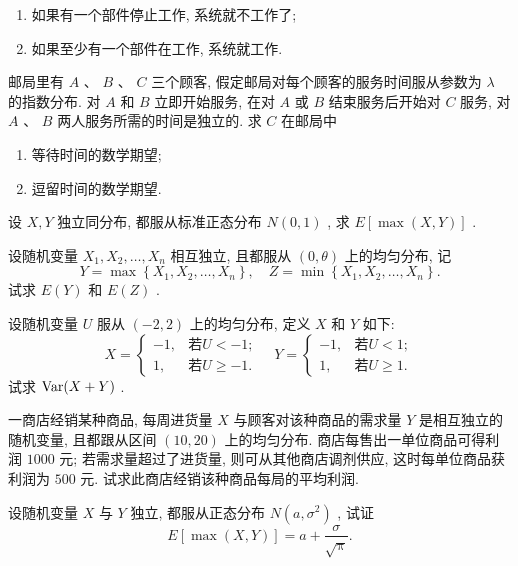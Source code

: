 \begin{xiti}
			\begin{enumerate}
				\item 如果有一个部件停止工作, 系统就不工作了;
				\item 如果至少有一个部件在工作, 系统就工作.
			\end{enumerate}
		\item 邮局里有 $A$ 、 $B$ 、 $C$ 三个顾客, 假定邮局对每个顾客的服务时间服从参数为 $\lambda$ 的指数分布. 对 $A$ 和 $B$ 立即开始服务, 在对 $A$ 或 $B$ 结束服务后开始对 $C$ 服务, 对 $A$ 、 $B$ 两人服务所需的时间是独立的. 求 $C$ 在邮局中
			\begin{enumerate}
				\item 等待时间的数学期望;
				\item 逗留时间的数学期望.
			\end{enumerate}
		\item 设 $X,Y$ 独立同分布, 都服从标准正态分布 $N(0,1)$ , 求 $E[\max(X,Y)]$ .
		\item 设随机变量 $X_1,X_2,\ldots,X_n$ 相互独立, 且都服从 $(0,\theta)$ 上的均匀分布, 记
			\begin{equation*}
				Y=\max \left\{X_{1}, X_{2}, \ldots, X_{n}\right\},\quad Z=\min \left\{X_{1}, X_{2}, \ldots, X_{n}\right\}.
			\end{equation*}
			试求 $E(Y)$ 和 $E(Z)$ .
		\item 设随机变量 $U$ 服从 $(-2,2)$ 上的均匀分布, 定义 $X$ 和 $Y$ 如下:
			\begin{equation*}
				X=\begin{cases}
					-1, & \text{若}U<-1;\\
					1, & \text{若}U\geqslant -1.
				\end{cases}\quad
				Y=\begin{cases}
					-1, & \text{若}U<1;\\
					1, & \text{若}U\geqslant 1.
				\end{cases}
			\end{equation*}
			试求 $\operatorname{Var}(X+Y)$ .
		\item 一商店经销某种商品, 每周进货量 $X$ 与顾客对该种商品的需求量 $Y$ 是相互独立的随机变量, 且都跟从区间 $(10,20)$ 上的均匀分布. 商店每售出一单位商品可得利润 $1000$ 元; 若需求量超过了进货量, 则可从其他商店调剂供应, 这时每单位商品获利润为 $500$ 元. 试求此商店经销该种商品每局的平均利润.
		\item 设随机变量 $X$ 与 $Y$ 独立, 都服从正态分布 $N\left(a,\sigma^2\right)$ , 试证
			\begin{equation*}
				E[\max(X,Y)]=a+\frac{\sigma}{\sqrt{\uppi}}.
			\end{equation*}

\end{xiti}

